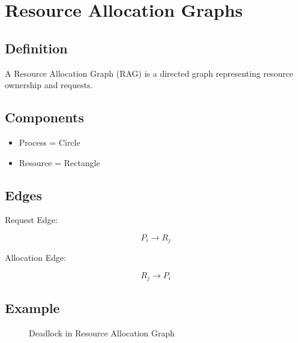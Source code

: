 \section{Resource Allocation Graphs}

\subsection{Definition}

A Resource Allocation Graph (RAG) is a directed graph representing resource ownership and requests.

\subsection{Components}

\begin{itemize}
\item Process = Circle
\item Resource = Rectangle
\end{itemize}

\subsection{Edges}

Request Edge:

\[
P_i \rightarrow R_j
\]

Allocation Edge:

\[
R_j \rightarrow P_i
\]

\subsection{Example}

\begin{figure}[H]
\centering
{}
\caption{Deadlock in Resource Allocation Graph}
\end{figure}

